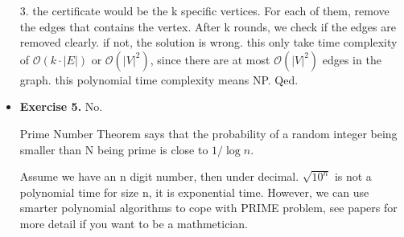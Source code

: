 \documentclass{article}
\newcommand{\bigO}{\mathcal{O}}
\begin{document}
\begin{itemize}
3. the certificate would be the k specific vertices. For each of them, remove the edges that contains the vertex. After k rounds, we check if the edges are removed clearly. if not, the solution is wrong. this only take time complexity of $\bigO (k\cdot |E|)$ or $\bigO (|V|^2)$, since there are at most $\bigO (|V|^2)$ edges in the graph. this polynomial time complexity means NP. Qed.

\item \textbf{Exercise 5.}
No.

Prime Number Theorem says that the probability of a random integer being smaller than N being prime is close to $1/\log n$.

 Assume we have an n digit number, then under decimal. $\sqrt{10^n}$ is not a polynomial time for size n, it is exponential time. However, we can use smarter polynomial algorithms to cope with PRIME problem, see papers for more detail if you want to be a mathmetician. 

\end{itemize}

\end{document}
